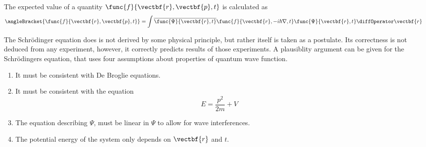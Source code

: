The expected value of a quantity \(\func{f}{\vectbf{r},\vectbf{p},t}\) is calculated as
\begin{equation*}
    \angleBracket{\func{f}{\vectbf{r},\vectbf{p},t}} = \int \overline{\func{\Psi}{\vectbf{r},t}} \func{f}{\vectbf{r},-i\hbar \nabla,t} \func{\Psi}{\vectbf{r},t} \diffOperator \vectbf{r}
\end{equation*}

\begin{remark}
    The Schr\"{o}dinger equation does is not derived by some physical principle, but rather itself is taken as a postulate. Its correctness is not deduced from any experiment, however, it correctly predicts results of those experiments. A plausiblity argument can be given for the Schr\"{o}dingers equation, that uses four assumptions about properties of quantum wave function.
    \begin{enumerate}
        \item It must be consistent with De Broglie equations.
        \item It must be consistent with the equation
              \begin{equation*}
                  E = \frac{p^2}{2m} + V
              \end{equation*}
        \item The equation describing \(\Psi\), must be linear in \(\Psi\) to allow for wave interferences.
        \item The potential energy of the system only depends on \(\vectbf{r}\) and \(t\).
    \end{enumerate}
\end{remark}

